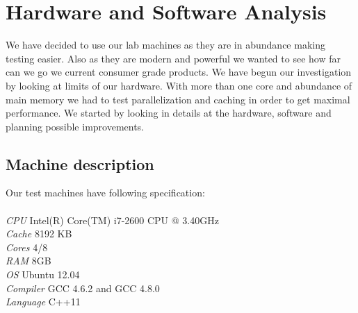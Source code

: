 \documentclass[conference]{IEEEtran}
\begin{document}
%



\section{Hardware and Software Analysis}

We have decided to use our lab machines as they are in abundance making testing easier.
Also as they are modern and powerful we wanted to see how far can we go we current consumer grade products.
We have begun our investigation by looking at limits of our hardware.
With more than one core and abundance of main memory we had to test parallelization and caching in order to get maximal performance.
We started by looking in details at the hardware, software and planning possible improvements.

\subsection{Machine description}
Our test machines have following specification:\\\\
\emph{CPU} Intel(R) Core(TM) i7-2600 CPU @ 3.40GHz\\
\emph{Cache} 8192 KB\\
\emph{Cores} 4/8\\
\emph{RAM} 8GB\\
\emph{OS} Ubuntu 12.04\\
\emph{Compiler} GCC 4.6.2 and GCC 4.8.0\\
\emph{Language} C++11
\end{document}
